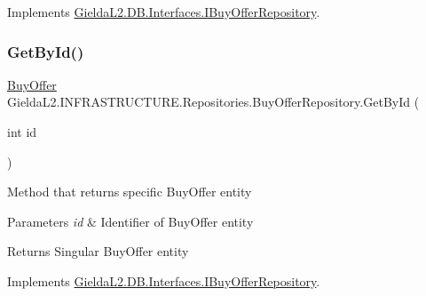 Implements \mbox{\hyperlink{interface_gielda_l2_1_1_d_b_1_1_interfaces_1_1_i_buy_offer_repository_aa086036b9ec0331e455c846193679851}{Gielda\+L2.\+D\+B.\+Interfaces.\+I\+Buy\+Offer\+Repository}}.

\mbox{\label{class_gielda_l2_1_1_i_n_f_r_a_s_t_r_u_c_t_u_r_e_1_1_repositories_1_1_buy_offer_repository_adf2f5395c33786befc29d371aecee31d}} 
\subsubsection{\texorpdfstring{GetById()}{GetById()}}
{\footnotesize\ttfamily \mbox{\hyperlink{class_gielda_l2_1_1_d_b_1_1_entities_1_1_buy_offer}{Buy\+Offer}} Gielda\+L2.\+I\+N\+F\+R\+A\+S\+T\+R\+U\+C\+T\+U\+R\+E.\+Repositories.\+Buy\+Offer\+Repository.\+Get\+By\+Id (\begin{DoxyParamCaption}\item[{int}]{id }\end{DoxyParamCaption})}



Method that returns specific Buy\+Offer entity 


\begin{DoxyParams}{Parameters}
{\em id} & Identifier of Buy\+Offer entity\\
\hline
\end{DoxyParams}
\begin{DoxyReturn}{Returns}
Singular Buy\+Offer entity
\end{DoxyReturn}


Implements \mbox{\hyperlink{interface_gielda_l2_1_1_d_b_1_1_interfaces_1_1_i_buy_offer_repository_ac7c415d55971e7a12d1f8d2c96d3d3e2}{Gielda\+L2.\+D\+B.\+Interfaces.\+I\+Buy\+Offer\+Repository}}.

\mbox{\label{class_gielda_l2_1_1_i_n_f_r_a_s_t_r_u_c_t_u_r_e_1_1_repositories_1_1_buy_offer_repository_a068d5dc2abf5a84ebd32a5cc6d2d835b}} 
